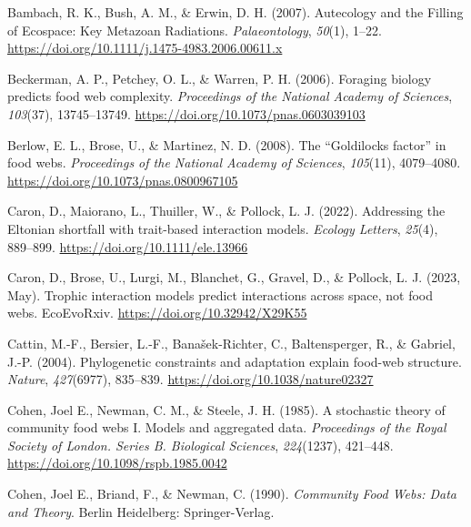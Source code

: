 \documentclass[
]{agujournal2019}
\newlength{\cslhangindent}
\newenvironment{CSLReferences}[2] %
 {\begin{list}{}{%
  \setlength{\itemindent}{0pt}
  \setlength{\leftmargin}{0pt}
  \setlength{\parsep}{0pt}
  \ifodd #1
   \setlength{\leftmargin}{\cslhangindent}
   \setlength{\itemindent}{-1\cslhangindent}
  \fi
  \setlength{\itemsep}{#2\baselineskip}}}
 {\end{list}}
\begin{document}
\label{refs}
\begin{CSLReferences}{1}{0}
Bambach, R. K., Bush, A. M., \& Erwin, D. H. (2007). Autecology and the
{Filling} of {Ecospace}: {Key Metazoan Radiations}.
\emph{Palaeontology}, \emph{50}(1), 1--22.
\url{https://doi.org/10.1111/j.1475-4983.2006.00611.x}

Beckerman, A. P., Petchey, O. L., \& Warren, P. H. (2006). Foraging
biology predicts food web complexity. \emph{Proceedings of the National
Academy of Sciences}, \emph{103}(37), 13745--13749.
\url{https://doi.org/10.1073/pnas.0603039103}

Berlow, E. L., Brose, U., \& Martinez, N. D. (2008). The {``{Goldilocks}
factor''} in food webs. \emph{Proceedings of the National Academy of
Sciences}, \emph{105}(11), 4079--4080.
\url{https://doi.org/10.1073/pnas.0800967105}

Caron, D., Maiorano, L., Thuiller, W., \& Pollock, L. J. (2022).
Addressing the {Eltonian} shortfall with trait-based interaction models.
\emph{Ecology Letters}, \emph{25}(4), 889--899.
\url{https://doi.org/10.1111/ele.13966}

Caron, D., Brose, U., Lurgi, M., Blanchet, G., Gravel, D., \& Pollock,
L. J. (2023, May). Trophic interaction models predict interactions
across space, not food webs. {EcoEvoRxiv}.
\url{https://doi.org/10.32942/X29K55}

Cattin, M.-F., Bersier, L.-F., Banašek-Richter, C., Baltensperger, R.,
\& Gabriel, J.-P. (2004). Phylogenetic constraints and adaptation
explain food-web structure. \emph{Nature}, \emph{427}(6977), 835--839.
\url{https://doi.org/10.1038/nature02327}

Cohen, Joel E., Newman, C. M., \& Steele, J. H. (1985). A stochastic
theory of community food webs {I}. {Models} and aggregated data.
\emph{Proceedings of the Royal Society of London. Series B. Biological
Sciences}, \emph{224}(1237), 421--448.
\url{https://doi.org/10.1098/rspb.1985.0042}

Cohen, Joel E., Briand, F., \& Newman, C. (1990). \emph{Community {Food
Webs}: {Data} and {Theory}}. {Berlin Heidelberg}: {Springer-Verlag}.


\end{CSLReferences}
\end{document}
